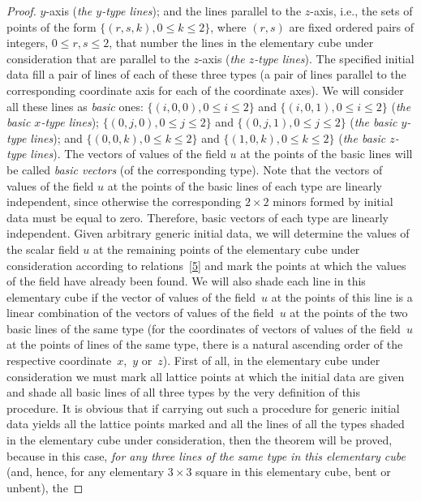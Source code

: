 \documentclass[pdftex]{sigma}
\begin{document}
\begin{proof}
$y$-axis ({\it the $y$-type lines}); and the lines parallel to the
$z$-axis, i.e., the sets of points of the form $\{(r, s, k), 0 \leq
k \leq 2\}$, where $(r, s)$ are f\/ixed ordered pairs of integers, $0
\leq r, s \leq 2$, that number the lines in the elementary cube
under consideration that are parallel to the $z$-axis ({\it the
$z$-type lines}). The specif\/ied initial data f\/ill a pair of lines of
each of these three types (a pair of lines parallel to the
corresponding coordinate axis for each of the coordinate axes). We
will consider all these lines as {\it basic} ones: $\{(i, 0, 0), 0
\leq i \leq 2\}$ and $\{(i, 0, 1), 0 \leq i \leq 2\}$ ({\it the
basic $x$-type lines}); $\{(0, j, 0), 0 \leq j \leq 2\}$ and $\{(0,
j, 1), 0 \leq j \leq 2\}$ ({\it the basic $y$-type lines}); and
$\{(0, 0, k), 0 \leq k \leq 2\}$ and $\{(1, 0, k), 0 \leq k \leq
2\}$ ({\it the basic $z$-type lines}). The vectors of values of the
f\/ield $u$ at the points of the basic lines will be called {\it basic
vectors} (of the corresponding type). Note that the vectors of
values of the f\/ield $u$ at the points of the basic lines of each
type are linearly independent, since otherwise the corresponding $2
\times 2$ minors formed by initial data must be equal to zero.
Therefore, basic vectors of each type are linearly independent.
Given arbitrary generic initial data, we will determine the values
of the scalar f\/ield $u$ at the remaining points of the elementary
cube under consideration according to relations~\eqref{5} and mark
the points at which the values of the f\/ield have already been found.
We will also shade each line in this elementary cube if the vector
of values of the f\/ield~$u$ at the points of this line is a linear
combination of the vectors of values of the f\/ield~$u$ at the points
of the two basic lines of the same type (for the coordinates of
vectors of values of the f\/ield~$u$ at the points of lines of the
same type, there is a natural ascending order of the respective
coordinate~$x$,~$y$ or~$z$). First of all, in the elementary cube
under consideration we must mark all lattice points at which the
initial data are given and shade all basic lines of all three types
by the very def\/inition of this procedure. It is obvious that if
carrying out such a procedure for generic initial data yields all
the lattice points marked and all the lines of all the types shaded
in the elementary cube under consideration, then the theorem will be
proved, because in this case, {\it for any three lines of the same
type in this elementary cube} (and, hence, for any elementary $3
\times 3$ square in this elementary cube, bent or unbent), the

\end{proof}
\end{document}
